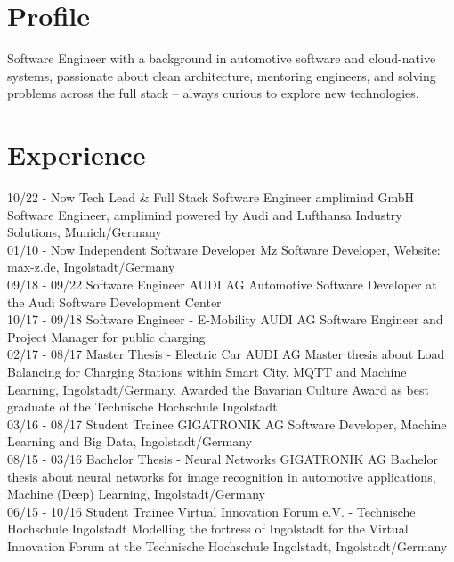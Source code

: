 \documentclass[]{friggeri-cv}
\begin{document}
\section{Profile}
Software Engineer with a background in automotive software and cloud-native systems, passionate about clean architecture, mentoring engineers, and solving problems across the full stack -- always curious to explore new technologies.
\section{Experience}
\begin{entrylist}
    \entry
    {10/22 - Now}
    {Tech Lead \& Full Stack Software Engineer}
    {amplimind GmbH}
    {Software Engineer, amplimind powered by Audi and Lufthansa Industry \\ Solutions, Munich/Germany\\}
    \entry
    {01/10 - Now}
    {Independent Software Developer}
    {Mz}
    {Software Developer, Website: max-z.de, Ingolstadt/Germany\\}
    \entry
    {09/18 - 09/22}
    {Software Engineer}
    {AUDI AG}
    {Automotive Software Developer at the Audi Software Development Center\\}
    \entry
    {10/17 - 09/18}
    {Software Engineer - E-Mobility}
    {AUDI AG}
    {Software Engineer and Project Manager for public charging \\}
    \entry
    {02/17 - 08/17}
    {Master Thesis - Electric Car}
    {AUDI AG}
    {Master thesis about Load Balancing for Charging Stations within Smart City, MQTT and Machine Learning, Ingolstadt/Germany. Awarded the Bavarian Culture Award as best graduate of the Technische Hochschule Ingolstadt\\}
    \entry
    {03/16 - 08/17}
    {Student Trainee}
    {GIGATRONIK AG}
    {Software Developer, Machine Learning and Big Data,  Ingolstadt/Germany\\}
    \entry
    {08/15 - 03/16}
    {Bachelor Thesis - Neural Networks}
    {GIGATRONIK AG}
    {Bachelor thesis about neural networks for image recognition in automotive applications, Machine (Deep) Learning, Ingolstadt/Germany\\}
    \entry
    {06/15 - 10/16}
    {Student Trainee}
    {Virtual Innovation Forum e.V. - Technische Hochschule Ingolstadt}
    {Modelling the fortress of Ingolstadt for the Virtual Innovation Forum at the Technische Hochschule Ingolstadt, Ingolstadt/Germany\\}

\end{entrylist}
\end{document}
